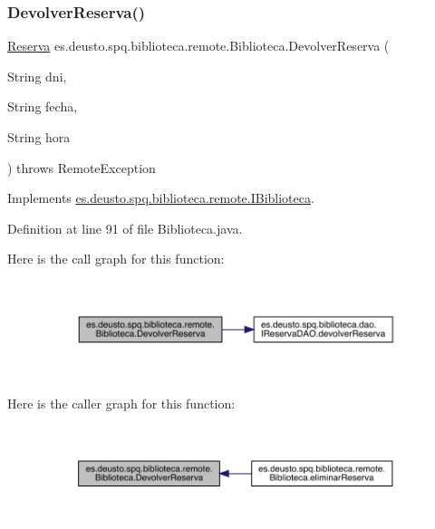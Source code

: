 \subsubsection{\texorpdfstring{Devolver\+Reserva()}{DevolverReserva()}}
{\footnotesize\ttfamily \mbox{\hyperlink{classes_1_1deusto_1_1spq_1_1biblioteca_1_1data_1_1_reserva}{Reserva}} es.\+deusto.\+spq.\+biblioteca.\+remote.\+Biblioteca.\+Devolver\+Reserva (\begin{DoxyParamCaption}\item[{String}]{dni,  }\item[{String}]{fecha,  }\item[{String}]{hora }\end{DoxyParamCaption}) throws Remote\+Exception}



Implements \mbox{\hyperlink{interfacees_1_1deusto_1_1spq_1_1biblioteca_1_1remote_1_1_i_biblioteca_a988bc8c24da1f11665ea205e2fc9b95e}{es.\+deusto.\+spq.\+biblioteca.\+remote.\+I\+Biblioteca}}.



Definition at line 91 of file Biblioteca.\+java.

Here is the call graph for this function\+:
\nopagebreak
\begin{figure}[H]
\begin{center}
\leavevmode
\includegraphics[width=350pt]{classes_1_1deusto_1_1spq_1_1biblioteca_1_1remote_1_1_biblioteca_ac1f6d54dda74f91519d3d6cbc86b35d6_cgraph}
\end{center}
\end{figure}
Here is the caller graph for this function\+:
\nopagebreak
\begin{figure}[H]
\begin{center}
\leavevmode
\includegraphics[width=350pt]{classes_1_1deusto_1_1spq_1_1biblioteca_1_1remote_1_1_biblioteca_ac1f6d54dda74f91519d3d6cbc86b35d6_icgraph}
\end{center}
\end{figure}
\mbox{\label{classes_1_1deusto_1_1spq_1_1biblioteca_1_1remote_1_1_biblioteca_a42f0baaeb77d185634a84f10936e8f8e}} 

